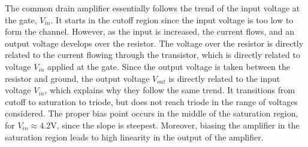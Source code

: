 The common drain amplifier essentially follows the trend of the input voltage at the gate, $V_{in}$. It starts in the cutoff region since the input voltage is too low to form the channel. However, as the input is increased, the current flows, and an output voltage develops over the resistor. The voltage over the resistor is directly related to the current flowing through the transistor, which is directly related to voltage $V_{in}$ applied at the gate. Since the output voltage is taken between the resistor and ground, the output voltage $V_{out}$ is directly related to the input voltage $V_{in}$, which explains why they follow the same trend. It transitions from cutoff to saturation to triode, but does not reach triode in the range of voltages considered. The proper bias point occurs in the middle of the saturation region, for $V_{in} \approx 4.2$\si{\volt}, since the slope is steepest. Moreover, biasing the amplifier in the saturation region leads to high linearity in the output of the amplifier.
